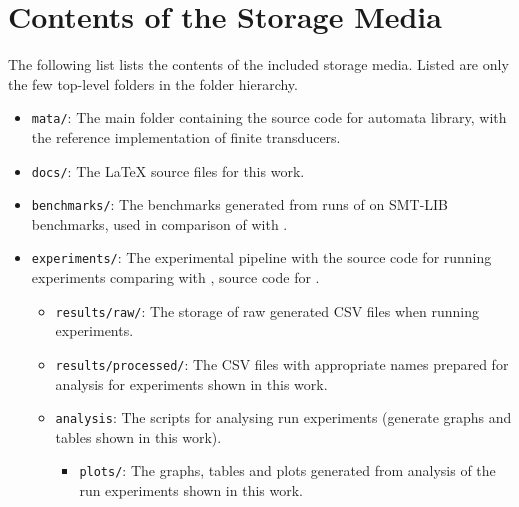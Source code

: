 
%

\chapter{Contents of the Storage Media}

The following list lists the contents of the included storage media. Listed are
only the few top-level folders in the folder hierarchy.

\begin{itemize}
	\item \texttt{mata/}: The main folder containing the source code for \mata automata library, with the reference implementation of finite transducers.
    \item \texttt{docs/}: The LaTeX source files for this work.
    \item \texttt{benchmarks/}: The benchmarks generated from runs of \noodler on SMT-LIB benchmarks, used in comparison of \mata with \mona.
    \item \texttt{experiments/}: The experimental pipeline with the source code for running experiments comparing \mata with \mona, source code for \mona.
    \begin{itemize}
        \item \texttt{results/raw/}: The storage of raw generated CSV files when running experiments.

        \item \texttt{results/processed/}: The CSV files with appropriate names prepared for analysis for experiments shown in this work.

        \item \texttt{analysis}: The scripts for analysing run experiments (generate graphs and tables shown in this work).
        \begin{itemize}
          \item \texttt{plots/}: The graphs, tables and plots generated from analysis of the run experiments shown in this work.
        \end{itemize}
    \end{itemize}
\end{itemize}

